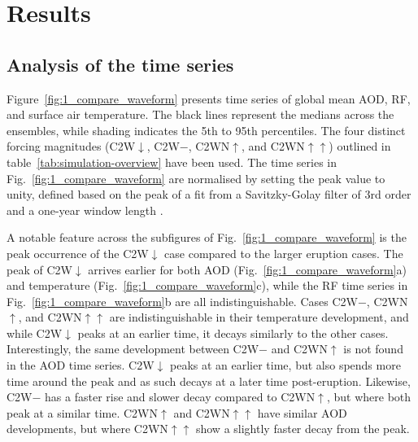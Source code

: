\documentclass[draft]{agujournal2019}
\newcommand{\cwm}{C2W\(\downarrow\)}
\newcommand{\cwmp}{C2W\(-\)}
\newcommand{\cws}{C2WN\(\uparrow\)}
\newcommand{\cwss}{C2WN\(\uparrow\uparrow\)}
\begin{document}
\section{Results}\label{sec:results}


\subsection{Analysis of the time series}

Figure~\ref{fig:1_compare_waveform} presents time series of global mean AOD, RF, and
surface air temperature. The black lines represent the medians across the ensembles,
while shading indicates the 5th to 95th percentiles. The four distinct forcing
magnitudes (\cwm{}, \cwmp{}, \cws{}, and \cwss{}) outlined in
table~\ref{tab:simulation-overview} have been used. The time series in
Fig.~\ref{fig:1_compare_waveform} are normalised by setting the peak value to unity,
defined based on the peak of a fit from a Savitzky-Golay filter of 3rd order and a
one-year window length \cite{savitzky1964}.

A notable feature across the subfigures of Fig.~\ref{fig:1_compare_waveform} is the peak
occurrence of the \cwm{} case compared to the larger eruption cases. The peak of \cwm{}
arrives earlier for both AOD (Fig.~\ref{fig:1_compare_waveform}a) and temperature
(Fig.~\ref{fig:1_compare_waveform}c), while the RF time series in
Fig.~\ref{fig:1_compare_waveform}b are all indistinguishable. Cases \cwmp{}, \cws{}, and
\cwss{} are indistinguishable in their temperature development, and while \cwm{} peaks
at an earlier time, it decays similarly to the other cases. Interestingly, the same
development between \cwmp{} and \cws{} is not found in the AOD time series. \cwm{} peaks
at an earlier time, but also spends more time around the peak and as such decays at a
later time post-eruption. Likewise, \cwmp{} has a faster rise and slower decay compared
to \cws{}, but where both peak at a similar time. \cws{} and \cwss{} have similar AOD
developments, but where \cwss{} show a slightly faster decay from the peak.
\end{document}
